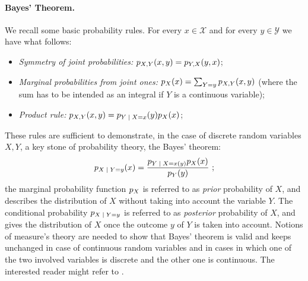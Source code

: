 \paragraph*{Bayes' Theorem.}
We recall some basic probability rules. For every $x\in\mathcal{X}$ and for every $y\in\mathcal{Y}$ we have what follows:
\begin{itemize}
\item \emph{Symmetry of joint probabilities: } $p_{X,Y}(x,y)=p_{Y,X}(y,x)$;
\item \emph{Marginal probabilities from joint ones: } $p_X(x) = \sum_{Y=y}p_{X,Y}(x,y)$ (where the sum has to be intended as an integral if $Y$ is a continuous variable);
\item \emph{Product rule: } $\pdf_{X,Y}(x,y) = \pdf_{\given{Y}{X=x}}(y)\pdf_{X}(x)$;
\end{itemize} 
These rules are sufficient to demonstrate, in the case of discrete random variables $X,Y$, a key stone of probability theory, the Bayes' theorem: 
\begin{equation}
\pdf_{\given{X}{Y=y}}(x) = \frac{\pdf_{\given{Y}{X=x}(y)}\pdf_{X}(x)}{\pdf_{Y}(y)} \mbox{ ;}
\end{equation}
the marginal probability function $p_X$ is referred to as \emph{prior} probability of $X$, and describes the distribution of $X$ without taking into account the variable $Y$. The conditional probability $\pdf_{\given{X}{Y=y}}$ is referred to as \emph{posterior} probability of $X$, and gives the distribution of $X$ once the outcome $y$ of $Y$ is taken into account. Notions of measure's theory are needed to show that Bayes' theorem is valid and keeps unchanged in case of continuous random variables and in cases in which one of the two involved variables is discrete and the other one is continuous. The interested reader might refer to \cite{feller2008introduction}. 

